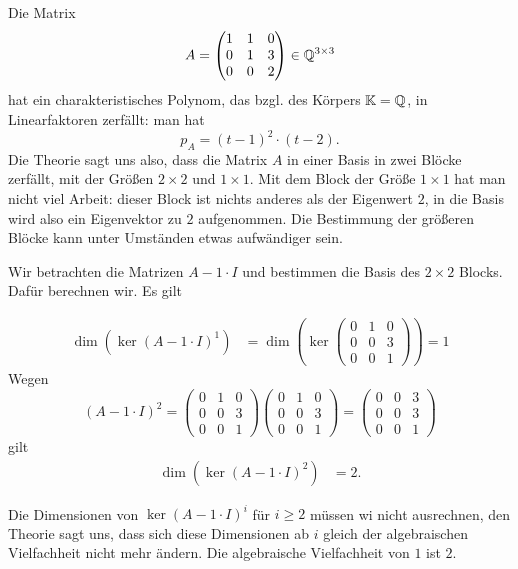 \begin{bsp} 
	Die Matrix 
	\[
	A = \begin{pmatrix}
		1 & 1 & 0 \\
		0 & 1 & 3 \\
		0 & 0 & 2
	\end{pmatrix} \in \mathbb Q^{3 \times 3} 
	\]
	hat ein charakteristisches Polynom, das bzgl. des Körpers 
	$ \mathbb K = \mathbb Q $, in Linearfaktoren zerfällt: man hat 
	\[ 
	p_A = (t-1)^2 \cdot (t-2).
	\]
	Die Theorie sagt uns also, dass die Matrix $A$ in einer Basis in zwei Blöcke zerfällt, mit der Größen $2 \times 2$ und $1 \times 1$. Mit dem Block der Größe $1 \times 1$ hat man nicht viel Arbeit: dieser Block ist nichts anderes als der Eigenwert $2$, in die Basis wird also ein Eigenvektor zu $2$ aufgenommen. Die Bestimmung der größeren Blöcke kann unter Umständen etwas aufwändiger sein. 
	
	
	Wir betrachten die Matrizen  $ A- 1\cdot I $ und bestimmen die Basis des $2 \times 2$ Blocks. Dafür berechnen wir. Es gilt
	
	\begin{align*}
		\dim( \ker(A-1\cdot I)^1 ) & = \dim \left( \ker\begin{pmatrix}
			0 & 1 & 0 \\
			0 & 0 & 3 \\
			0 & 0 & 1
		\end{pmatrix} \right) = 1
	\end{align*}
	Wegen 
	\begin{equation*}
		(A-1\cdot I)^2 = \begin{pmatrix}
			0 & 1 & 0 \\
			0 & 0 & 3 \\
			0 & 0 & 1
		\end{pmatrix} \begin{pmatrix}
			0 & 1 & 0 \\
			0 & 0 & 3 \\
			0 & 0 & 1
		\end{pmatrix} = \begin{pmatrix}
			0 & 0 & 3 \\
			0 & 0 & 3 \\
			0 & 0 & 1
		\end{pmatrix}
	\end{equation*}
	gilt 
	\begin{align*} 
		\dim(\ker(A-1\cdot I)^2) & =  2.
	\end{align*}
	
	Die Dimensionen von $\ker(A - 1\cdot I)^i$ für $i \ge 2$ müssen wi nicht ausrechnen, den Theorie sagt uns, dass sich diese Dimensionen ab $i$ gleich der algebraischen Vielfachheit nicht mehr ändern. Die algebraische Vielfachheit von $1$ ist $2$. 
	

\end{bsp}
